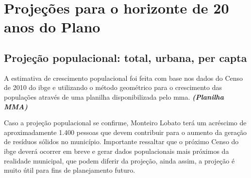 \newpage
\FloatBarrier
\section{Projeções para o horizonte de 20 anos do Plano}

\subsection{Projeção populacional: total, urbana, per capta}

A estimativa de crescimento populacional foi feita com base nos dados do Censo de 2010 do \gls{ibge} e utilizando o método geométrico para o crescimento das populações através de uma planilha disponibilizada pelo \gls{mma}. \textbf{\textit{(Planilha MMA)}}  %



Caso a projeção populacional se confirme, Monteiro Lobato terá um acréscimo de aproximadamente 1.400 pessoas que devem contribuir para o aumento da geração de resíduos sólidos no município. Importante ressaltar que o próximo Censo do \gls{ibge} deverá ocorrer em breve e gerar dados populacionais mais próximos da realidade municipal, que podem diferir da projeção, ainda assim, a projeção é muito útil para fins de planejamento futuro.

